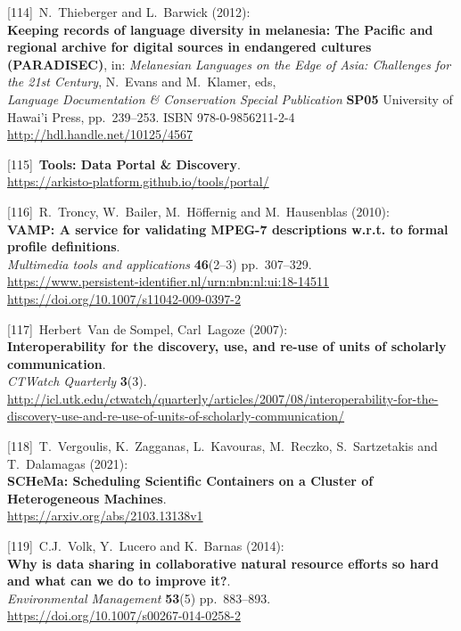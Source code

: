 {[}114{]}~N.~Thieberger and L.~Barwick (2012):\\
\textbf{Keeping records of language diversity in melanesia: The Pacific
and regional archive for digital sources in endangered cultures
(PARADISEC)}, in: \emph{Melanesian Languages on the Edge of Asia:
Challenges for the 21st Century}, N.~Evans and M.~Klamer, eds,\\
\emph{Language Documentation \& Conservation Special Publication}
\textbf{SP05} University of Hawai'i Press, pp.~239--253. ISBN
978-0-9856211-2-4\\
\url{http://hdl.handle.net/10125/4567}

{[}115{]}~\textbf{Tools: Data Portal \& Discovery}.\\
\url{https://arkisto-platform.github.io/tools/portal/}

{[}116{]}~R.~Troncy, W.~Bailer, M.~Höffernig and M.~Hausenblas (2010):\\
\textbf{VAMP: A service for validating MPEG-7 descriptions w.r.t. to
formal profile definitions}.\\
\emph{Multimedia tools and applications} \textbf{46}(2--3)
pp.~307--329.\\
\url{https://www.persistent-identifier.nl/urn:nbn:nl:ui:18-14511}~\\
\url{https://doi.org/10.1007/s11042-009-0397-2}

{[}117{]}~Herbert~Van de Sompel, Carl~Lagoze (2007):\\
\textbf{Interoperability for the discovery, use, and re-use of units of
scholarly communication}.\\
\emph{CTWatch Quarterly} \textbf{3}(3).\\
\url{http://icl.utk.edu/ctwatch/quarterly/articles/2007/08/interoperability-for-the-discovery-use-and-re-use-of-units-of-scholarly-communication/}

{[}118{]}~T.~Vergoulis, K.~Zagganas, L.~Kavouras, M.~Reczko,
S.~Sartzetakis and T.~Dalamagas (2021):\\
\textbf{SCHeMa: Scheduling Scientific Containers on a Cluster of
Heterogeneous Machines}.\\
\url{https://arxiv.org/abs/2103.13138v1}

{[}119{]}~C.J.~Volk, Y.~Lucero and K.~Barnas (2014):\\
\textbf{Why is data sharing in collaborative natural resource efforts so
hard and what can we do to improve it?}.\\
\emph{Environmental Management} \textbf{53}(5) pp.~883--893.\\
\url{https://doi.org/10.1007/s00267-014-0258-2}

